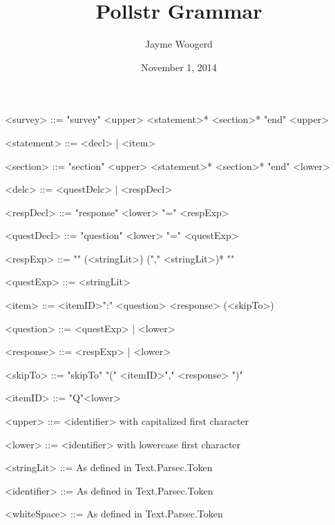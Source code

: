\documentclass{article}
\title{Pollstr Grammar}
\author{Jayme Woogerd}
\date{November 1, 2014}
\begin{document}
\maketitle
\thispagestyle{empty}

\begin{grammar}

    <survey>     ::= "survey"  <upper> <statement>* <section>* "end" <upper>

    <statement>  ::= <decl> | <item>

    <section>    ::= "section" <upper> <statement>* <section>* "end" <lower>

    <delc>       ::= <questDelc> | <respDecl>

    <respDecl>   ::= "response" <lower> "=" <respExp>

    <questDecl>  ::= "question" <lower> "=" <questExp>

    <respExp>    ::= "{" (<stringLit>) ("," <stringLit>)* "}"

    <questExp>   ::= <stringLit>

    <item>       ::= <itemID>":" <question> <response> (<skipTo>)

    <question>   ::= <questExp> | <lower>

    <response>   ::= <respExp> | <lower>

    <skipTo>     ::= "skipTo" "(" <itemID>"," <response> ")"

    <itemID>     ::= "Q"<lower>

    <upper> ::= <identifier> with capitalized first character
    
    <lower>      ::= <identifier> with lowercase first character

    <stringLit>  ::= As defined in Text.Parsec.Token

    <identifier> ::= As defined in Text.Parsec.Token

    <whiteSpace> ::= As defined in Text.Parsec.Token


\end{grammar}
\end{document}
